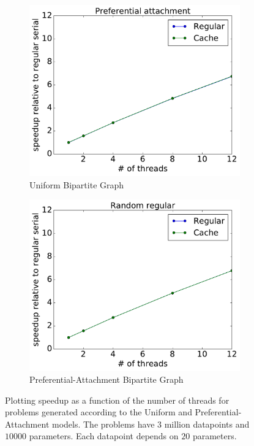 \documentclass[times,11pt]{article}
\numberwithin{equation}{section}		%
\numberwithin{figure}{section}			%
\numberwithin{table}{section}				%
\begin{document}
\begin{figure}[h!]
\centering
    \begin{subfigure}[b]{0.49\columnwidth}
	\centerline{\includegraphics[width = 0.85\columnwidth, trim={0 0.1cm  0 0}, clip]{LS_speedup_prefattach.pdf}}
      \caption{\scriptsize Uniform Bipartite Graph}
      \label{fig:unif}
    \end{subfigure}
   \begin{subfigure}[b]{0.49\columnwidth}
      	\centerline{\includegraphics[width = 0.85\columnwidth, trim={0 0.1cm  0 0}, clip]{LS_speedup_regular.pdf}}
      \caption{\scriptsize Preferential-Attachment Bipartite Graph}
      \label{fig:pref}
    \end{subfigure}
  \caption{Plotting speedup as a function of the number of threads for problems generated according to the Uniform and Preferential-Attachment models. The problems have $3$ million datapoints and $10000$ parameters. Each datapoint depends on $20$ parameters.}
  \label{fig:unif-pref}
\end{figure}
 
\end{document}
